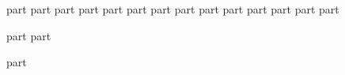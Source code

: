 {part}
{part}
{part}
{part}
{part}
{part}
{part}
{part}
{part}
{part}
{part}
{part}
{part}
{part}

{part}
{part}

\backmatter
{part}
